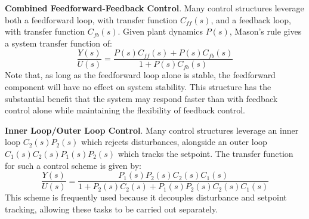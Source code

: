 \textbf{Combined Feedforward-Feedback Control}. Many control structures leverage both a feedforward loop, with transfer function $C_{ff}(s)$, and a feedback loop, with transfer function $C_{fb}(s)$. Given plant dynamics $P(s)$, Mason's rule gives a system transfer function of: \[\frac{Y(s)}{U(s)} = \frac{P(s)C_{ff}(s) + P(s)C_{fb}(s)}{1 + P(s) C_{fb}(s)}\] Note that, as long as the feedforward loop alone is stable, the feedforward component will have no effect on system stability. This structure has the substantial benefit that the system may respond faster than with feedback control alone while maintaining the flexibility of feedback control.

\textbf{Inner Loop/Outer Loop Control}. Many control structures leverage an inner loop $C_2(s)P_2(s)$ which rejects disturbances, alongside an outer loop $C_1(s)C_2(s)P_1(s)P_2(s)$ which tracks the setpoint. The transfer function for such a control scheme is given by: \[\frac{Y(s)}{U(s)} = \frac{P_1(s)P_2(s)C_2(s)C_1(s)}{1+P_2(s)C_2(s) + P_1(s)P_2(s)C_2(s)C_1(s)}\] This scheme is frequently used because it decouples disturbance and setpoint tracking, allowing these tasks to be carried out separately.
